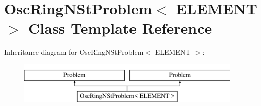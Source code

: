 \hypertarget{classOscRingNStProblem}{}\section{Osc\+Ring\+N\+St\+Problem$<$ E\+L\+E\+M\+E\+NT $>$ Class Template Reference}
\label{classOscRingNStProblem}
Inheritance diagram for Osc\+Ring\+N\+St\+Problem$<$ E\+L\+E\+M\+E\+NT $>$\+:\begin{figure}[H]
\begin{center}
\leavevmode
\includegraphics[height=2.000000cm]{classOscRingNStProblem}
\end{center}
\end{figure}
